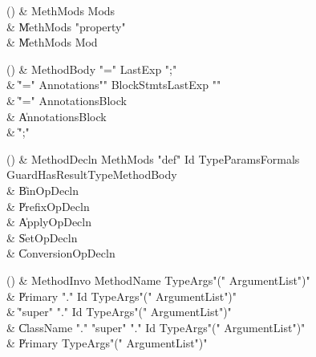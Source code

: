 \begin{bbgrammarappendix}{4.2in}

() & MethMods \label{prod:MethMods}  \: Mods\opt  \\

 &    \| MethMods \xcd"property"  \\
 &    \| MethMods Mod \\

\end{bbgrammarappendix}

\begin{bbgrammarappendix}{4.0in}

() & MethodBody \label{prod:MethodBody}  \: \xcd"=" LastExp \xcd";"  \\

 &    \| \xcd"=" Annotations\opt \xcd"{" BlockStmts\opt LastExp \xcd"}" \\
 &    \| \xcd"=" Annotations\opt Block \\
 &    \| Annotations\opt Block \\
 &    \| \xcd";" \\

\end{bbgrammarappendix}

\begin{bbgrammarappendix}{3.9in}

() & MethodDecln \label{prod:MethodDecln}  \: MethMods \xcd"def" Id TypeParams\opt Formals Guard\opt HasResultType\opt MethodBody  \\

 &    \| BinOpDecln \\
 &    \| PrefixOpDecln \\
 &    \| ApplyOpDecln \\
 &    \| SetOpDecln \\
 &    \| ConversionOpDecln \\

\end{bbgrammarappendix}

\begin{bbgrammarappendix}{4.0in}

() & MethodInvo \label{prod:MethodInvo}  \: MethodName TypeArgs\opt \xcd"(" ArgumentList\opt \xcd")"  \\

 &    \| Primary \xcd"." Id TypeArgs\opt \xcd"(" ArgumentList\opt \xcd")" \\
 &    \| \xcd"super" \xcd"." Id TypeArgs\opt \xcd"(" ArgumentList\opt \xcd")" \\
 &    \| ClassName \xcd"." \xcd"super"  \xcd"." Id TypeArgs\opt \xcd"(" ArgumentList\opt \xcd")" \\
 &    \| Primary TypeArgs\opt \xcd"(" ArgumentList\opt \xcd")" \\

\end{bbgrammarappendix}

